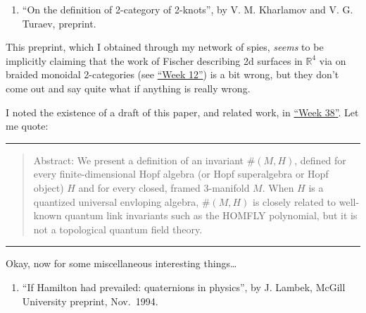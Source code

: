 \documentclass{article}
\def\tightlist{}
\renewcommand{\texttt}[1]{%
  \begingroup
  \ttfamily
  \begingroup\lccode`~=`/\lowercase{\endgroup\def~}{/\discretionary{}{}{}}%
  \begingroup\lccode`~=`[\lowercase{\endgroup\def~}{[\discretionary{}{}{}}%
  \begingroup\lccode`~=`.\lowercase{\endgroup\def~}{.\discretionary{}{}{}}%
  \catcode`/=\active\catcode`[=\active\catcode`.=\active
  \scantokens{#1\noexpand}%
  \endgroup
}
\begin{document}
\begin{enumerate}
\def\labelenumi{\arabic{enumi})}
\setcounter{enumi}{8}
\tightlist
\item
  ``On the definition of 2-category of 2-knots'', by V. M. Kharlamov and
  V. G. Turaev, preprint.
\end{enumerate}

This preprint, which I obtained through my network of spies,
\emph{seems} to be implicitly claiming that the work of Fischer
describing 2d surfaces in \(\mathbb{R}^4\) via on braided monoidal
2-categories (see \protect\hyperlink{week12}{``Week 12''}) is a bit
wrong, but they don't come out and say quite what if anything is really
wrong.


I noted the existence of a draft of this paper, and related work, in
\protect\hyperlink{week38}{``Week 38''}. Let me quote:

\begin{center}\rule{0.5\linewidth}{0.5pt}\end{center}

\begin{quote}
Abstract: We present a definition of an invariant \(\#(M,H)\), defined
for every finite-dimensional Hopf algebra (or Hopf superalgebra or Hopf
object) \(H\) and for every closed, framed 3-manifold \(M\). When \(H\)
is a quantized universal envloping algebra, \(\#(M,H)\) is closely
related to well-known quantum link invariants such as the HOMFLY
polynomial, but it is not a topological quantum field theory.
\end{quote}

\begin{center}\rule{0.5\linewidth}{0.5pt}\end{center}

Okay, now for some miscellaneous interesting things\ldots{}

\begin{enumerate}
\def\labelenumi{\arabic{enumi})}
\setcounter{enumi}{10}
\tightlist
\item
  ``If Hamilton had prevailed: quaternions in physics'', by J. Lambek,
  McGill University preprint, Nov.~1994.
\end{enumerate}
\end{document}
